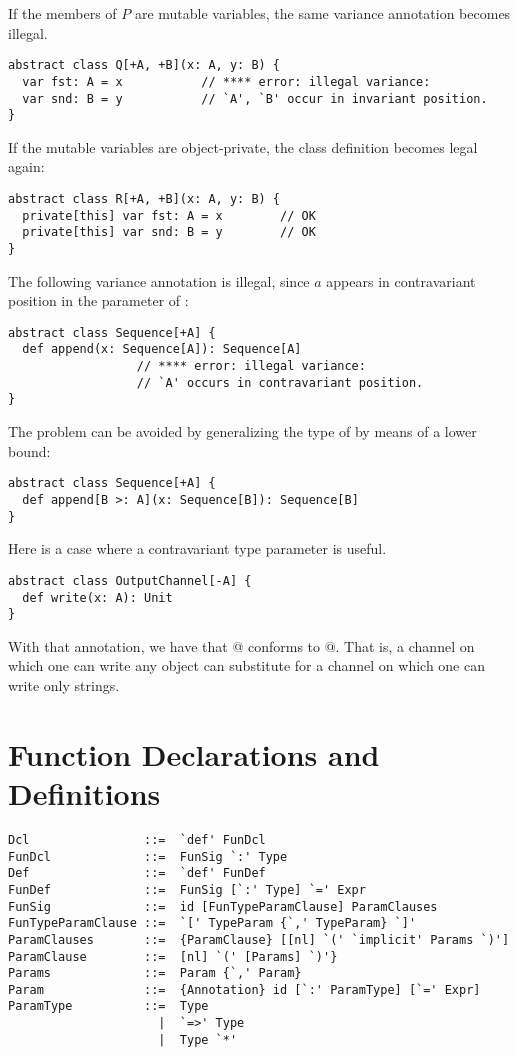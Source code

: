 If the members of $P$ are mutable variables, 
the same variance annotation becomes illegal. 
\begin{lstlisting}
abstract class Q[+A, +B](x: A, y: B) { 
  var fst: A = x           // **** error: illegal variance:
  var snd: B = y           // `A', `B' occur in invariant position.
}
\end{lstlisting}
If the mutable variables are object-private, the class definition
becomes legal again:
\begin{lstlisting}
abstract class R[+A, +B](x: A, y: B) { 
  private[this] var fst: A = x        // OK
  private[this] var snd: B = y        // OK
}
\end{lstlisting}

\example The following variance annotation is illegal, since $a$ appears
in contravariant position in the parameter of :

\begin{lstlisting}
abstract class Sequence[+A] {
  def append(x: Sequence[A]): Sequence[A]  
                  // **** error: illegal variance: 
                  // `A' occurs in contravariant position.
}
\end{lstlisting} 
The problem can be avoided by generalizing the type of 
by means of a lower bound:

\begin{lstlisting}
abstract class Sequence[+A] {
  def append[B >: A](x: Sequence[B]): Sequence[B] 
}
\end{lstlisting}

\example Here is a case where a contravariant type parameter is useful.

\begin{lstlisting}
abstract class OutputChannel[-A] {
  def write(x: A): Unit
}
\end{lstlisting}
With that annotation, we have that
\lstinline@OutputChannel[AnyRef]@ conforms to \lstinline@OutputChannel[String]@.  
That is, a
channel on which one can write any object can substitute for a channel
on which one can write only strings.

\section{Function Declarations and Definitions}
\label{sec:funsigs}

\syntax\begin{lstlisting} 
Dcl                ::=  `def' FunDcl
FunDcl             ::=  FunSig `:' Type
Def                ::=  `def' FunDef
FunDef             ::=  FunSig [`:' Type] `=' Expr 
FunSig             ::=  id [FunTypeParamClause] ParamClauses
FunTypeParamClause ::=  `[' TypeParam {`,' TypeParam} `]' 
ParamClauses       ::=  {ParamClause} [[nl] `(' `implicit' Params `)']
ParamClause        ::=  [nl] `(' [Params] `)'} 
Params             ::=  Param {`,' Param}
Param              ::=  {Annotation} id [`:' ParamType] [`=' Expr]
ParamType          ::=  Type 
                     |  `=>' Type 
                     |  Type `*'
\end{lstlisting}

